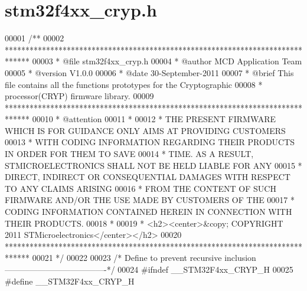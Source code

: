 \section{stm32f4xx\+\_\+cryp.\+h}
\label{stm32f4xx__cryp_8h_source}

\begin{DoxyCode}
00001 \textcolor{comment}{/**}
00002 \textcolor{comment}{  ******************************************************************************}
00003 \textcolor{comment}{  * @file    stm32f4xx\_cryp.h}
00004 \textcolor{comment}{  * @author  MCD Application Team}
00005 \textcolor{comment}{  * @version V1.0.0}
00006 \textcolor{comment}{  * @date    30-September-2011}
00007 \textcolor{comment}{  * @brief   This file contains all the functions prototypes for the Cryptographic}
00008 \textcolor{comment}{  *          processor(CRYP) firmware library.}
00009 \textcolor{comment}{  ******************************************************************************}
00010 \textcolor{comment}{  * @attention}
00011 \textcolor{comment}{  *}
00012 \textcolor{comment}{  * THE PRESENT FIRMWARE WHICH IS FOR GUIDANCE ONLY AIMS AT PROVIDING CUSTOMERS}
00013 \textcolor{comment}{  * WITH CODING INFORMATION REGARDING THEIR PRODUCTS IN ORDER FOR THEM TO SAVE}
00014 \textcolor{comment}{  * TIME. AS A RESULT, STMICROELECTRONICS SHALL NOT BE HELD LIABLE FOR ANY}
00015 \textcolor{comment}{  * DIRECT, INDIRECT OR CONSEQUENTIAL DAMAGES WITH RESPECT TO ANY CLAIMS ARISING}
00016 \textcolor{comment}{  * FROM THE CONTENT OF SUCH FIRMWARE AND/OR THE USE MADE BY CUSTOMERS OF THE}
00017 \textcolor{comment}{  * CODING INFORMATION CONTAINED HEREIN IN CONNECTION WITH THEIR PRODUCTS.}
00018 \textcolor{comment}{  *}
00019 \textcolor{comment}{  * <h2><center>&copy; COPYRIGHT 2011 STMicroelectronics</center></h2>}
00020 \textcolor{comment}{  ******************************************************************************}
00021 \textcolor{comment}{  */}
00022 
00023 \textcolor{comment}{/* Define to prevent recursive inclusion -------------------------------------*/}
00024 \textcolor{preprocessor}{#}\textcolor{preprocessor}{ifndef} \textcolor{preprocessor}{\_\_STM32F4xx\_CRYP\_H}
00025 \textcolor{preprocessor}{#}\textcolor{preprocessor}{define} \textcolor{preprocessor}{\_\_STM32F4xx\_CRYP\_H}

\end{DoxyCode}
